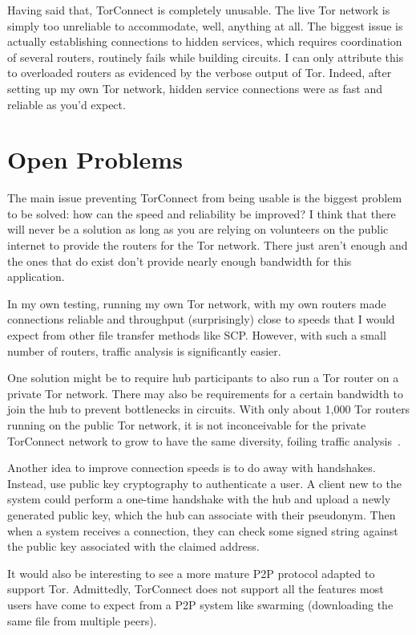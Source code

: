 \documentclass{article}
\begin{document}
Having said that, TorConnect is completely unusable.  The live Tor network is simply too unreliable to accommodate, well, anything at all.  The biggest issue is actually establishing connections to hidden services, which requires coordination of several routers, routinely fails while building circuits.  I can only attribute this to overloaded routers as evidenced by the verbose output of Tor.  Indeed, after setting up my own Tor network, hidden service connections were as fast and reliable as you'd expect.

\section{Open Problems}
The main issue preventing TorConnect from being usable is the biggest problem to be solved: how can the speed and reliability be improved?  I think that there will never be a solution as long as you are relying on volunteers on the public internet to provide the routers for the Tor network.  There just aren't enough and the ones that do exist don't provide nearly enough bandwidth for this application.

In my own testing, running my own Tor network, with my own routers made connections reliable and throughput (surprisingly) close to speeds that I would expect from other file transfer methods like SCP.  However, with such a small number of routers, traffic analysis is significantly easier.

One solution might be to require hub participants to also run a Tor router on a private Tor network.  There may also be requirements for a certain bandwidth to join the hub to prevent bottlenecks in circuits.  With only about 1,000 Tor routers running on the public Tor network, it is not inconceivable for the private TorConnect network to grow to have the same diversity, foiling traffic analysis~\cite{tor-numrouters}.

Another idea to improve connection speeds is to do away with handshakes.  Instead, use public key cryptography to authenticate a user.  A client new to the system could perform a one-time handshake with the hub and upload a newly generated public key, which the hub can associate with their pseudonym.  Then when a system receives a connection, they can check some signed string against the public key associated with the claimed address.

It would also be interesting to see a more mature P2P protocol adapted to support Tor.  Admittedly, TorConnect does not support all the features most users have come to expect from a P2P system like swarming (downloading the same file from multiple peers).
\end{document}
